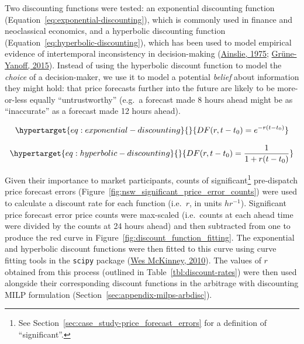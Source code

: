 \documentclass[12pt,a4paper,]{report}
\begin{document}
Two discounting functions were tested: an exponential discounting
function (Equation~\ref{eq:exponential-discounting}), which is commonly
used in finance and neoclassical economics, and a hyperbolic discounting
function (Equation~\ref{eq:hyperbolic-discounting}), which has been used
to model empirical evidence of intertemporal inconsistency in
decision-making
(\protect\hyperlink{ref-ainslieSpeciousRewardBehavioral1975}{Ainslie,
1975};
\protect\hyperlink{ref-grune-yanoffModelsTemporalDiscounting2015}{Grüne-Yanoff,
2015}). Instead of using the hyperbolic discount function to model the
\emph{choice} of a decision-maker, we use it to model a potential
\emph{belief} about information they might hold: that price forecasts
further into the future are likely to be more-or-less equally
``untrustworthy'' (e.g.~a forecast made 8 hours ahead might be as
``inaccurate'' as a forecast made 12 hours ahead).

\begin{equation}\protect\hypertarget{eq:exponential-discounting}{}{DF(r, t-t_0) = e^{-r(t-t_0)}}\label{eq:exponential-discounting}\end{equation}

\begin{equation}\protect\hypertarget{eq:hyperbolic-discounting}{}{DF(r, t-t_0) = \frac{1}{1+r(t-t_0)}}\label{eq:hyperbolic-discounting}\end{equation}

Given their importance to market participants, counts of
significant\footnote{See
  Section~\ref{sec:case_study-price_forecast_errors} for a definition of
  ``significant''.} pre-dispatch price forecast errors
(Figure~\ref{fig:nsw_significant_price_error_counts}) were used to
calculate a discount rate for each function (i.e.~\(r\), in units
\(hr^{-1}\)). Significant price forecast error price counts were
max-scaled (i.e.~counts at each ahead time were divided by the counts at
24 hours ahead) and then subtracted from one to produce the red curve in
Figure~\ref{fig:discount_function_fitting}. The exponential and
hyperbolic discount functions were then fitted to this curve using curve
fitting tools in the \texttt{scipy} package
(\protect\hyperlink{ref-mckinney-proc-scipy-2010}{Wes McKinney, 2010}).
The values of \(r\) obtained from this process (outlined in
Table~\ref{tbl:discount-rates}) were then used alongside their
corresponding discount functions in the arbitrage with discounting MILP
formulation (Section~\ref{sec:appendix-milps-arbdisc}).
\end{document}
